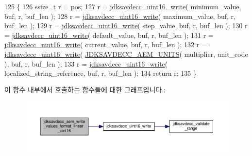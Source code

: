 \begin{DoxyCode}
125 \{
126     ssize\_t r = pos;
127     r = \hyperlink{group__endian_ga4c0851ce17bde5306fdb04bfb5b75af1}{jdksavdecc\_uint16\_write}( minimum\_value, buf, r, buf\_len );
128     r = \hyperlink{group__endian_ga4c0851ce17bde5306fdb04bfb5b75af1}{jdksavdecc\_uint16\_write}( maximum\_value, buf, r, buf\_len );
129     r = \hyperlink{group__endian_ga4c0851ce17bde5306fdb04bfb5b75af1}{jdksavdecc\_uint16\_write}( step\_value, buf, r, buf\_len );
130     r = \hyperlink{group__endian_ga4c0851ce17bde5306fdb04bfb5b75af1}{jdksavdecc\_uint16\_write}( default\_value, buf, r, buf\_len );
131     r = \hyperlink{group__endian_ga4c0851ce17bde5306fdb04bfb5b75af1}{jdksavdecc\_uint16\_write}( current\_value, buf, r, buf\_len );
132     r = \hyperlink{group__endian_ga4c0851ce17bde5306fdb04bfb5b75af1}{jdksavdecc\_uint16\_write}( \hyperlink{group__aem__descriptor_gae5f7498f6048b4dda1aca923b0eae0f6}{JDKSAVDECC\_AEM\_UNITS}( 
      multiplier, unit\_code ), buf, r, buf\_len );
133     r = \hyperlink{group__endian_ga4c0851ce17bde5306fdb04bfb5b75af1}{jdksavdecc\_uint16\_write}( localized\_string\_reference, buf, r, buf\_len );
134     \textcolor{keywordflow}{return} r;
135 \}
\end{DoxyCode}


이 함수 내부에서 호출하는 함수들에 대한 그래프입니다.\+:
\nopagebreak
\begin{figure}[H]
\begin{center}
\leavevmode
\includegraphics[width=350pt]{group__aem__descriptor_ga6881b00ee9de6aa26c46709f19a1eac0_cgraph}
\end{center}
\end{figure}


